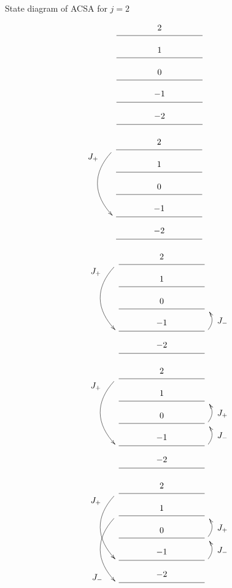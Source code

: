\documentclass[pdf,colorBG,slideColor,fyma]{prosper}
\begin{document}
 {
\begin{slide}{State diagram of ACSA for $j=2$}
{
  \[
  \xymatrix@R=20pt@C=100pt{
    \ar@{}[ddd] \ar@{-}[r]^-*+{2} & \\
    \ar@{}[ddd] \ar@{-}[r]^-*+{1} & \\
    \ar@{-}[r]^-*+{0} & \ar@{}[u] \\
    \ar@{-}[r]^-*+{-1} & \ar@{}[u] \\
    \ar@{-}[r]^-*+{-2} &
  }
  \]
}
{
  \[
  \xymatrix@R=20pt@C=100pt{
    \ar@(dl,ul)[ddd]_<<<<<*+{J_+} \ar@{-}[r]^-*+{2} & \hspace{34pt}\\
    \ar@{}[ddd] \ar@{-}[r]^-*+{1} & \hspace{34pt}\\
    \ar@{-}[r]^-*+{0} & \ar@{}[u] \hspace{34pt}\\
    \ar@{-}[r]^-*+{-1} & \ar@{}[u] \hspace{34pt}\\
    \ar@{-}[r]^-*+{-2} & \hspace{34pt}
  }
  \]
}
{
  \[
  \xymatrix@R=20pt@C=100pt{
    \ar@(dl,ul)[ddd]_<<<<<*+{J_+} \ar@{-}[r]^-*+{2} & \\
    \ar@{}[ddd] \ar@{-}[r]^-*+{1} & \\
    \ar@{-}[r]^-*+{0} & \ar@{}[u] \\
    \ar@{-}[r]^-*+{-1} & \ar@/_/[u]_-*+{J_-} \\
    \ar@{-}[r]^-*+{-2} &
  }
  \]
}
{
  \[
  \xymatrix@R=20pt@C=100pt{
    \ar@(dl,ul)[ddd]_<<<<<*+{J_+} \ar@{-}[r]^-*+{2} & \\
    \ar@{}[ddd] \ar@{-}[r]^-*+{1} & \\
    \ar@{-}[r]^-*+{0} & \ar@/_/[u]_-*+{J_+} \\
    \ar@{-}[r]^-*+{-1} & \ar@/_/[u]_-*+{J_-} \\
    \ar@{-}[r]^-*+{-2} &
  }
  \]
}
{
  \[
  \xymatrix@R=20pt@C=100pt{
    \ar@(dl,ul)[ddd]_<<<<<*+{J_+} \ar@{-}[r]^-*+{2} & \\
    \ar@(dl,ul)[ddd]_>>>>>*+{J_-} \ar@{-}[r]^-*+{1} & \\
    \ar@{-}[r]^-*+{0} & \ar@/_/[u]_-*+{J_+} \\
    \ar@{-}[r]^-*+{-1} & \ar@/_/[u]_-*+{J_-} \\
    \ar@{-}[r]^-*+{-2} &
  }
  \]
}
\end{slide}
}
\end{document}
